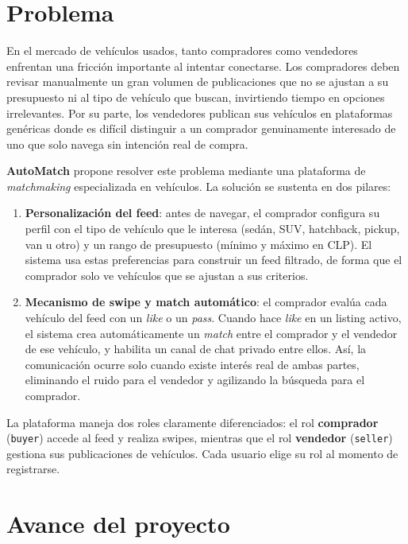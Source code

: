 \documentclass[12pt,a4paper]{article}
\begin{document}
\section{Problema}

En el mercado de vehículos usados, tanto compradores como vendedores enfrentan una fricción
importante al intentar conectarse. Los compradores deben revisar manualmente un gran volumen de
publicaciones que no se ajustan a su presupuesto ni al tipo de vehículo que buscan, invirtiendo
tiempo en opciones irrelevantes. Por su parte, los vendedores publican sus vehículos en
plataformas genéricas donde es difícil distinguir a un comprador genuinamente interesado de uno
que solo navega sin intención real de compra.

\textbf{AutoMatch} propone resolver este problema mediante una plataforma de \emph{matchmaking}
especializada en vehículos. La solución se sustenta en dos pilares:

\begin{enumerate}
  \item \textbf{Personalización del feed}: antes de navegar, el comprador configura su perfil con
        el tipo de vehículo que le interesa (sedán, SUV, hatchback, pickup, van u otro) y un rango
        de presupuesto (mínimo y máximo en CLP). El sistema usa estas preferencias para construir
        un feed filtrado, de forma que el comprador solo ve vehículos que se ajustan a sus
        criterios.
  \item \textbf{Mecanismo de swipe y match automático}: el comprador evalúa cada vehículo del
        feed con un \emph{like} o un \emph{pass}. Cuando hace \emph{like} en un listing activo, el
        sistema crea automáticamente un \emph{match} entre el comprador y el vendedor de ese
        vehículo, y habilita un canal de chat privado entre ellos. Así, la comunicación ocurre
        solo cuando existe interés real de ambas partes, eliminando el ruido para el vendedor y
        agilizando la búsqueda para el comprador.
\end{enumerate}

La plataforma maneja dos roles claramente diferenciados: el rol \textbf{comprador} (\texttt{buyer})
accede al feed y realiza swipes, mientras que el rol \textbf{vendedor} (\texttt{seller}) gestiona
sus publicaciones de vehículos. Cada usuario elige su rol al momento de registrarse.

\newpage
\section{Avance del proyecto}
\end{document}
